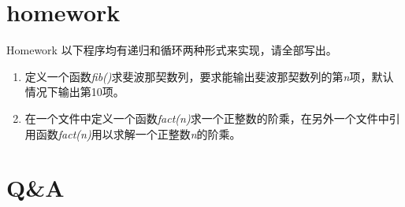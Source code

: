 \documentclass{beamer}
\begin{document}
\section{homework}
\begin{frame}{Homework}
以下程序均有递归和循环两种形式来实现，请全部写出。
\begin{enumerate}
\item
定义一个函数\textit{fib()}求斐波那契数列，要求能输出斐波那契数列的第\textit{n}项，默认情况下输出第10项。
\item
在一个文件中定义一个函数\textit{fact(n)}求一个正整数的阶乘，在另外一个文件中引用函数\textit{fact(n)}用以求解一个正整数\textit{n}的阶乘。
\end{enumerate}
\end{frame}
\section{Q\&A}
\begin{frame}
\end{frame}


%
\end{document}
